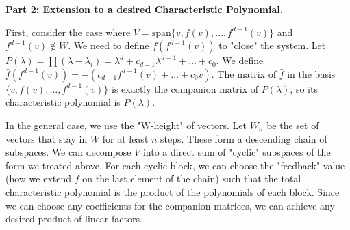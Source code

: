 \begin{solution}
\bigskip

\textbf{Part 2: Extension to a desired Characteristic Polynomial.}

First, consider the case where $V = \mathrm{span}\{v, f(v), \dots, f^{d-1}(v)\}$ and $f^{d-1}(v) \notin W$. We need to define $f(f^{d-1}(v))$ to "close" the system.
Let $P(\lambda) = \prod (\lambda - \lambda_i) = \lambda^d + c_{d-1}\lambda^{d-1} + \dots + c_0$.
We define $\bar{f}(f^{d-1}(v)) = -(c_{d-1}f^{d-1}(v) + \dots + c_0 v)$.
The matrix of $\bar{f}$ in the basis $\{v, f(v), \dots, f^{d-1}(v)\}$ is exactly the companion matrix of $P(\lambda)$, so its characteristic polynomial is $P(\lambda)$.

\bigskip

In the general case, we use the "W-height" of vectors. Let $W_n$ be the set of vectors that stay in $W$ for at least $n$ steps. These form a descending chain of subspaces. We can decompose $V$ into a direct sum of "cyclic" subspaces of the form we treated above. For each cyclic block, we can choose the "feedback" value (how we extend $f$ on the last element of the chain) such that the total characteristic polynomial is the product of the polynomials of each block. Since we can choose any coefficients for the companion matrices, we can achieve any desired product of linear factors.
\end{solution}
